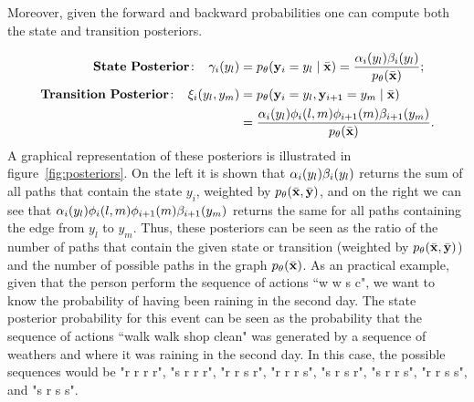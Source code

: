 Moreover, given the forward and backward probabilities one can compute both the state
and transition posteriors.

\begin{align}
 \mathbf{State \ Posterior\!:}\;\;\;\;   \gamma_i({y}_l) &= p_\theta(\mathbf{y}_i = {y}_l \mid \bar{\mathbf{x}}) = \frac{\alpha_i({y}_l) \beta_i({y}_l)}{p_{\theta}(\bar{\mathbf{x}})}; \label{eq::nodePosterior2} \\
 \mathbf{Transition \ Posterior\!:}\;\;\;\;  \xi_i({y}_l,{y}_m) &= p_\theta(\mathbf{y}_i = {y}_l, \mathbf{y}_{i+1}= {y}_m  \mid \bar{\mathbf{x}}) \nonumber\\
 &=  \frac{\alpha_i({y}_l) \phi_i(l,m)\phi_{i+1}(m)\beta_{i+1}({y}_m)}{p_{\theta}(\bar{\mathbf{x}})}.\label{eq::edgePosterior2}
\end{align}
A graphical representation of these posteriors is illustrated in figure~\ref{fig:posteriors}. 
On the left it is shown that $\alpha_i({y}_l) \beta_i({y}_l)$ returns the sum of all paths that contain the state $y_i$, weighted by $p_{\theta}(\bar{\mathbf{x}} ,\bar{\mathbf{y}})$, and on the right we can see that $\alpha_i({y}_l) \phi_i(l,m)\phi_{i+1}(m)\beta_{i+1}({y}_m)$ returns the same for all paths containing the edge from $y_l$ to $y_m$.
Thus, these posteriors can be seen as the ratio of the number of paths that contain the given state or transition (weighted by $p_{\theta}(\bar{\mathbf{x}} ,\bar{\mathbf{y}})$) and the number of possible paths in the graph $p_{\theta}(\bar{\mathbf{x}})$.
As an practical example, given that the person perform the sequence of actions ``w w s c", we want to know the probability of having been raining in the second day. The state posterior probability for this event can be seen as the probability that the sequence of actions ``walk walk shop clean" was generated by a sequence of weathers and where it was raining in the second day. In this case, the possible sequences would be "r r r r", "s r r r", "r r s r", "r r r s", "s r s r", "s r r s", "r r s s", and "s r s s".

